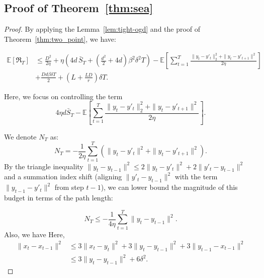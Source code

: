 \documentclass[journal,onecolumn]{IEEEtran}
\theoremstyle{plain}
\theoremstyle{definition}
\theoremstyle{remark}
\newcommand{\regret}{\mathfrak{R}}
\begin{document}
{\subsection{Proof of Theorem~\ref{thm:sea}}
\begin{proof}
    By applying the Lemma~\ref{lem:tight-ogd} and the proof of Theorem~\ref{thm:two_point},
    we have:

    \begin{align*}
        \mathbb{E}[\regret_{T}] & \le\frac{D^{2}}{2\eta}+\eta\left( 4d\,\bar S_{T}+ \left(\frac{d^{2}}{2}+4d\right)\beta^{2}\delta^{2}T \right)-\mathbb{E}\left[\sum_{t=1}^{T}\frac{\|y_{t} - y'_{t}\|_{2}^{2} + \|y_{t} - y'_{t+1}\|^{2}}{2\eta}\right] \\
                                & +\frac{Dd\beta\delta T}{2}+\left(L+\frac{LD}{r}\right)\delta T.
    \end{align*}

    Here, we focus on controlling the term
    \begin{equation*}
        4\eta d \bar S_{T}-\mathbb{E}\left[\sum_{t=1}^{T}\frac{\|y_{t} - y'_{t}\|_{2}^{2}
        + \|y_{t} - y'_{t+1}\|^{2}}{2\eta}\right].
    \end{equation*}

    We denote $N_{T}$ as:
    \begin{equation*}
        N_{T} = - \frac{1}{2\eta}\sum_{t=1}^{T} \left( \|y_{t} - y'_{t}\|^{2} + \|
        y_{t} - y'_{t+1}\|^{2} \right).
    \end{equation*}
    By the triangle inequality
    $\|y_{t} - y_{t-1}\|^{2} \le 2\|y_{t} - y'_{t}\|^{2} + 2\|y'_{t} - y_{t-1}\|^{2}$
    and a summation index shift (aligning $\|y'_{t} - y_{t-1}\|^{2}$ with the term
    $\|y_{t-1}- y'_{t}\|^{2}$ from step $t-1$), we can lower bound the magnitude
    of this budget in terms of the path length:

    \begin{equation*}
        N_{T} \le - \frac{1}{4\eta}\sum_{t=1}^{T} \|y_{t} - y_{t-1}\|^{2}.
    \end{equation*}
    Also, we have Here,
    \begin{align*}
        \|x_{t}-x_{t-1}\|^{2} & \leq 3\|x_{t}-y_{t}\|^{2}+3\|y_{t}-y_{t-1}\|^{2}+3\|y_{t-1}-x_{t-1}\|^{2} \\
                              & \leq 3\|y_{t}-y_{t-1}\|^{2}+6\delta^{2}.
    \end{align*}


\end{proof}}
\end{document}
